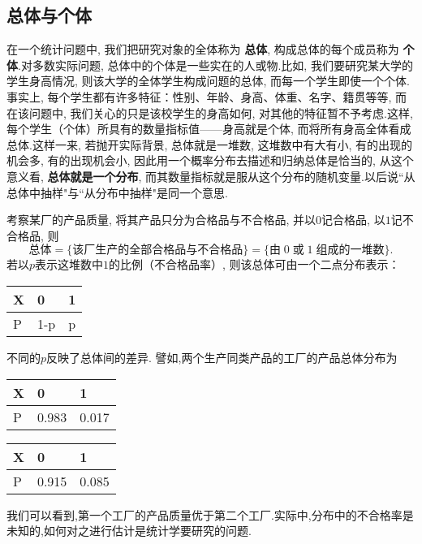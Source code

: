 \subsection{总体与个体\label{ssec:5.1.1}}
在一个统计问题中, 我们把研究对象的全体称为 \textbf{总体}, 构成总体的每个成员称为 \textbf{个体}.对多数实际问题, 总体中的个体是一些实在的人或物.比如, 我们要研究某大学的学生身高情况, 则该大学的全体学生构成问题的总体, 而每一个学生即使一个个体.事实上, 每个学生都有许多特征：性别、年龄、身高、体重、名字、籍贯等等, 而在该问题中, 我们关心的只是该校学生的身高如何, 对其他的特征暂不予考虑.这样, 每个学生（个体）所具有的数量指标值——身高就是个体, 而将所有身高全体看成总体.这样一来, 若抛开实际背景, 总体就是一堆数, 这堆数中有大有小, 有的出现的机会多, 有的出现机会小, 因此用一个概率分布去描述和归纳总体是恰当的, 从这个意义看,  \textbf{总体就是一个分布}, 而其数量指标就是服从这个分布的随机变量.以后说``从总体中抽样"与``从分布中抽样"是同一个意思.
\begin{example}
考察某厂的产品质量, 将其产品只分为合格品与不合格品, 并以$0$记合格品, 以$1$记不合格品, 则
\[\text{总体}=\{\text{该厂生产的全部合格品与不合格品}\}=\{\text{由}\;0\;\text{或}\;1\;\text{组成的一堆数}\}.\]
若以$p$表示这堆数中$1$的比例（不合格品率）, 则该总体可由一个二点分布表示：
\begin{center}
\begin{tabularx}{0.4\textwidth}{Y|YY}
  X&0&1\\
  \midrule
  P&1-p&p
  \end{tabularx}
\end{center}
不同的$p$反映了总体间的差异. 譬如,两个生产同类产品的工厂的产品总体分布为

\begin{minipage}{0.4\textwidth}
\centering
\begin{tabularx}{\textwidth}{Y|YY}
X&0&1\\
\midrule
P&0.983&0.017
\end{tabularx}
\end{minipage}\hspace{3\ccwd}
\begin{minipage}{0.4\textwidth}
\centering
\begin{tabularx}{\textwidth}{Y|YY}
X&0&1\\
\midrule
P&0.915&0.085
\end{tabularx}
\end{minipage}

我们可以看到,第一个工厂的产品质量优于第二个工厂.实际中,分布中的不合格率是未知的,如何对之进行估计是统计学要研究的问题.
\end{example}
